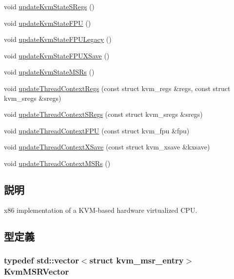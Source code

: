 \begin{DoxyCompactItemize}
void \hyperlink{classX86KvmCPU_af58754cb34827756e0e0fc8474c54a8e}{updateKvmStateSRegs} ()
\item 
void \hyperlink{classX86KvmCPU_a1c8ff9ec0ad33f11a2212a37e2a79f6c}{updateKvmStateFPU} ()
\item 
void \hyperlink{classX86KvmCPU_a3eccabf97e73ee194068ee37c2422c50}{updateKvmStateFPULegacy} ()
\item 
void \hyperlink{classX86KvmCPU_aa1d3c8572c67dd0c4457ba46307f35f1}{updateKvmStateFPUXSave} ()
\item 
void \hyperlink{classX86KvmCPU_ad04202aafaacd818cf2621c5a31926c1}{updateKvmStateMSRs} ()
\item 
void \hyperlink{classX86KvmCPU_a3e652bccdd2770630eb4e7bfb0b31b5e}{updateThreadContextRegs} (const struct kvm\_\-regs \&regs, const struct kvm\_\-sregs \&sregs)
\item 
void \hyperlink{classX86KvmCPU_aaca63820cd695ae9a2d1bafa76f2ebf6}{updateThreadContextSRegs} (const struct kvm\_\-sregs \&sregs)
\item 
void \hyperlink{classX86KvmCPU_a1f9b85cc469eb72bbf377872c1404c1e}{updateThreadContextFPU} (const struct kvm\_\-fpu \&fpu)
\item 
void \hyperlink{classX86KvmCPU_a64c8d7da4ee94fdaeb4e61d7106c01cf}{updateThreadContextXSave} (const struct kvm\_\-xsave \&kxsave)
\item 
void \hyperlink{classX86KvmCPU_ad0f81dc69ee0b095b4c9eeec4491ed39}{updateThreadContextMSRs} ()
\end{DoxyCompactItemize}


\subsection{説明}
x86 implementation of a KVM-\/based hardware virtualized CPU. 

\subsection{型定義}
\hypertarget{classX86KvmCPU_aa498445286177d1e3901b007c40f52c9}{
\subsubsection[{KvmMSRVector}]{\setlength{\rightskip}{0pt plus 5cm}typedef {\bf std::vector}$<$struct kvm\_\-msr\_\-entry$>$ {\bf KvmMSRVector}}}
\label{classX86KvmCPU_aa498445286177d1e3901b007c40f52c9}


